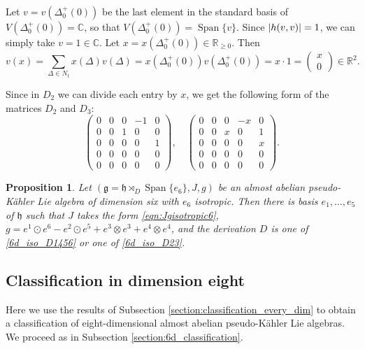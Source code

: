 \documentclass{article}
\newtheorem{proposition}[theorem]{Proposition}
\theoremstyle{definition}
\newcommand{\R}{\mathbb{R}}
\newcommand{\C}{\mathbb{C}}
\newcommand{\frg}{\mathfrak{g}}
\newcommand{\frh}{\mathfrak{h}}
\DeclarePairedDelimiter{\abs}{\lvert}{\rvert}
\newcommand{\Span}[1]{\operatorname{Span}\{#1\}}
\begin{document}
Let $v=v(\Delta_0^+(0))$ be the last element in the standard basis of $V(\Delta_0^+(0))=\C$, so that $V(\Delta_0^+(0))=\Span{v}$. Since $\abs{h(v,v)}=1$, we can simply take $v=1\in\C$. Let $x=x(\Delta_0^+(0))\in\R_{\geq0}$. Then $$v(x)=\sum_{\Delta\in N_t}x(\Delta)v(\Delta)=x(\Delta_0^+(0))v(\Delta_0^+(0))=x\cdot1=\begin{pmatrix}
    x\\0
\end{pmatrix}\in\R^2.$$

Since in $D_2$ we can divide each entry by $x$, we get the following form of the matrices $D_2$ and $D_3$: \begin{equation}\label{6d_iso_D23}
    \left(\begin{smallmatrix}
        0 & 0 & 0 & -1 & 0 \\
        0 & 0 & 1 & 0 & 0 \\
        0 & 0 & 0 & 0 & 1 \\
        0 & 0 & 0 & 0 & 0 \\
        0 & 0 & 0 & 0 & 0
    \end{smallmatrix}\right),\quad \left(\begin{smallmatrix}
        0 & 0 & 0 & -x & 0 \\
        0 & 0 & x & 0 & 1 \\
        0 & 0 & 0 & 0 & x \\
        0 & 0 & 0 & 0 & 0 \\
        0 & 0 & 0 & 0 & 0
    \end{smallmatrix}\right).
\end{equation}

\begin{proposition}\label{prop:class_6d_isotropic}
    Let $(\frg=\frh\rtimes_D\Span{e_6},J,g)$ be an almost abelian pseudo-Kähler Lie algebra of dimension six with $e_6$ isotropic. Then there is basis $e_1,\dotsc, e_5$ of $\frh$ such that $J$ takes the form \eqref{eqn:Jgisotropic6}, $g=e^1\odot e^6-e^2\odot e^5+e^3\otimes e^3+e^4\otimes e^4$, and the derivation $D$ is one of \eqref{6d_iso_D1456} or one of \eqref{6d_iso_D23}.
\end{proposition}

\subsection{Classification in dimension eight}\label{section:8d_classification}

Here we use the results of Subsection \ref{section:classification_every_dim} to obtain a classification of eight-dimensional almost abelian pseudo-Kähler Lie algebras. We proceed as in Subsection \ref{section:6d_classification}.\medskip
\end{document}
